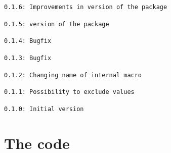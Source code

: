 \documentclass[11pt,a4paper]{ltxdoc}
\begin{document}
\texttt{0.1.6: Improvements in  version of the package}

\texttt{0.1.5:  version of the package}

\texttt{0.1.4: Bugfix}

\texttt{0.1.3: Bugfix}

\texttt{0.1.2: Changing name of internal macro}

\texttt{0.1.1: Possibility to exclude values}

\texttt{0.1.0: Initial version}

\section{The code}

\end{document}
